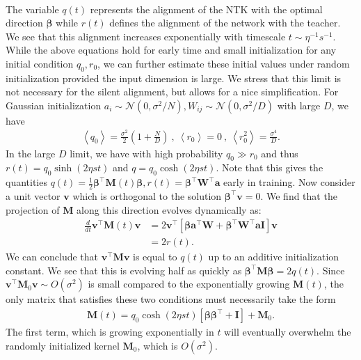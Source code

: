 \documentclass{article} %
\begin{document}
\begin{appendix}
\begin{equation}
\begin{aligned}
\end{aligned}
\end{equation}
The variable $q(t)$ represents the alignment of the NTK with the optimal direction $\bm \beta$ while $r(t)$ defines the alignment of the network with the teacher. We see that this alignment increases exponentially with timescale $t \sim \eta^{-1} s^{-1}$. While the above equations hold for early time and small initialization for any initial condition $q_0, r_0$, we can further estimate these initial values under random initialization provided the input dimension is large. We stress that this limit is not necessary for the silent alignment, but allows for a nice simplification. For Gaussian initialization $a_i \sim \mathcal N(0,\sigma^2/N), W_{ij} \sim \mathcal{N}(0,\sigma^2/D)$ with large $D$, we have
\begin{align}\label{eq:qr}
    \left<q_0\right> = \frac{\sigma^2}{2} \left( 1 + \frac{N}{D}  \right) \ , \ \left<r_0\right>= 0 \ , \ \left<r_0^2\right> = \frac{\sigma^4}{D}.
\end{align}
In the large $D$ limit, we have with high probability $q_0 \gg r_0$ and thus $r(t) = q_0 \sinh(2 \eta st)$ and $q = q_0 \cosh(2 \eta st)$.  Note that this gives the quantities $q(t) = \frac{1}{2} \bm\beta^\top \bm M(t) \bm\beta, r(t) = \bm\beta^\top \bm W^\top \bm a$ early in training. Now consider a unit vector $\bm v$ which is orthogonal to the solution $\bm \beta^\top \bm v = 0$. We find that the projection of $\mathbf M$ along this direction evolves dynamically as: 
\begin{equation}
\begin{aligned}
        \frac{d}{d t} \bm{v}^\top \bm M(t) \bm v &= 2 \bm v^\top \left[ \bm \beta \bm a^\top \bm W  + \bm \beta^\top \bm W^\top \bm a  \bm I   \right] \bm v
    \\
    &= 2 r(t).
\end{aligned}
\end{equation}
We can conclude that $\bm v^\top \bm M \bm v$ is equal to $q(t)$ up to an additive initialization constant. We see that this is evolving half as quickly as $\bm \beta^\top \bm M \bm \beta = 2 q(t)$. Since $\bm v^\top \bm M_0 \bm v \sim O(\sigma^2)$ is small compared to the exponentially growing $\bm M(t)$, the only matrix that satisfies these two conditions must necessarily take the form
\begin{align}
    \bm M(t) = q_0 \cosh(2\eta s t) \left[ \bm\beta \bm\beta^\top + \bm I \right] + \bm M_0.
\end{align}
The first term, which is growing exponentially in $t$ will eventually overwhelm the randomly initialized kernel $\bm M_0$, which is $O(\sigma^2)$.


\end{appendix}
\end{document}
